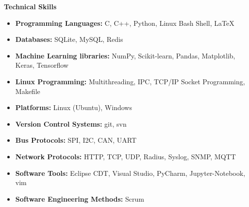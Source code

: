 \documentclass[letterpaper,11pt]{article}
\newcommand{\resheading}[1]{{\large \colorbox{mygrey}{\begin{minipage}{\textwidth}{\textbf{#1 \vphantom{p\^{E}}}}\end{minipage}}}}
\begin{document}
\resheading{Technical Skills}

\begin{itemize}
    \item \textbf{Programming Languages:} C, C++, Python, Linux Bash Shell, LaTeX
    \vspace{-4pt}
    
    \item \textbf{Databases:} SQLite, MySQL, Redis
    \vspace{-4pt}

    \item \textbf{Machine Learning libraries:} NumPy, Scikit-learn, Pandas, Matplotlib, Keras, Tensorflow
    \vspace{-4pt}
    
    \item \textbf{Linux Programming:} Multithreading, IPC, TCP/IP Socket Programming, Makefile
    \vspace{-4pt}
    
    \item \textbf{Platforms:} Linux (Ubuntu), Windows
    \vspace{-4pt}

    \item \textbf{Version Control Systems:} git, svn
    \vspace{-4pt}
    
    \item \textbf{Bus Protocols:} SPI, I2C, CAN, UART
    \vspace{-4pt}
    
    \item \textbf{Network Protocols:} HTTP, TCP, UDP, Radius, Syslog, SNMP, MQTT
    \vspace{-4pt}

    \item \textbf{Software Tools:} Eclipse CDT, Visual Studio, PyCharm, Jupyter-Notebook, vim
    \vspace{-4pt}

    \item \textbf{Software Engineering Methods:} Scrum
    \vspace{-4pt}

\end{itemize}
\end{document}
